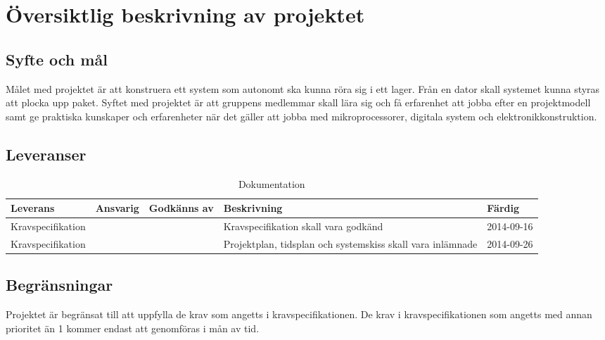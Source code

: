 \section{Översiktlig beskrivning av projektet}


\subsection{Syfte och mål}
Målet med projektet är att konstruera ett system som autonomt ska kunna röra sig i ett lager. Från en dator skall systemet kunna styras att plocka upp paket. Syftet med projektet är att gruppens medlemmar skall lära sig och få erfarenhet att jobba efter en projektmodell samt ge praktiska kunskaper och erfarenheter när det gäller att jobba med mikroprocessorer, digitala system och elektronikkonstruktion.

\subsection{Leveranser}

\begin{table}[h]
	\centering
		\begin{tabularx}{\textwidth}{| l | l | X | l | l |}
			\hline
			\textbf{Leverans} & \textbf{Ansvarig} & \textbf{Godkänns av} & \textbf{Beskrivning} & \textbf{Färdig} \\
			\hline
			{Kravspecifikation} & {} & {} & {Kravspecifikation skall vara godkänd} & {2014-09-16} \\
			\hline

			{Kravspecifikation} & {} & {} & {Projektplan, tidsplan och systemskiss skall vara inlämnade} & {2014-09-26} \\
			\hline
		\end{tabularx}
	\caption{Dokumentation} \label{dokumentation:tabell}
\end{table}


\subsection{Begränsningar}

Projektet är begränsat till att uppfylla de krav som angetts i kravspecifikationen. De krav i kravspecifikationen som angetts med annan prioritet än 1 kommer endast att genomföras i mån av tid. 